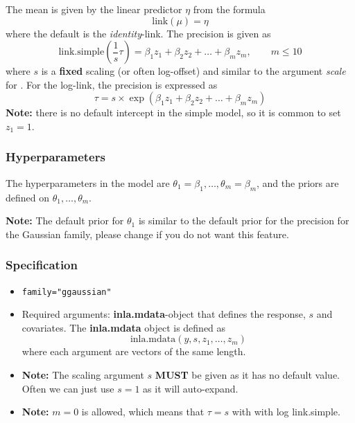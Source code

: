 \documentclass[a4paper,11pt]{article}
\begin{document}
The mean is given by the linear predictor $\eta$ from the formula
\begin{displaymath}
    \text{link}(\mu) = \eta
\end{displaymath}
where the default is the \emph{identity}-link. The precision is given
as
\begin{displaymath}
    \text{link.simple}(\frac{1}{s}\tau) = \beta_1 z_1 + \beta_2
    z_2 + \ldots + \beta_{m} z_{m}, \qquad m \leq 10
\end{displaymath}
where $s$ is a \textbf{fixed} scaling (or often log-offset) and
similar to the argument \emph{scale} for .
For the log-link, the precision is expressed as
\begin{displaymath}
    \tau = s \times \exp\left(\beta_1 z_1 + \beta_2
      z_2 + \ldots + \beta_{m} z_{m}\right)
\end{displaymath}
\textbf{Note:} there is no default intercept in the simple model, so
it is common to set $z_1=1$.

\subsubsection*{Hyperparameters}
The hyperparameters in the model are
$\theta_1=\beta_1, \ldots, \theta_m=\beta_m$, and the priors are
defined on $\theta_1, \ldots, \theta_m$.

\textbf{Note:} The default prior for $\theta_1$ is similar to the
default prior for the precision for the Gaussian family, please change
if you do not want this feature.


\subsubsection*{Specification}
\begin{itemize}
\item \texttt{family="ggaussian"}
\item Required arguments: \textbf{inla.mdata}-object that defines the
    response, $s$ and covariates. The \textbf{inla.mdata} object is
    defined as
    \begin{displaymath}
        \text{inla.mdata}(y, s, z_1, \ldots, z_m)
    \end{displaymath}
    where each argument are vectors of the same length.
\item \textbf{Note:} The scaling argument $s$ \textbf{MUST} be given
    as it has no default value. Often we can just use $s=1$ as it will
    auto-expand.
\item \textbf{Note:} $m=0$ is allowed, which means that $\tau=s$ with
    with log link.simple.
\end{itemize}
\end{document}
